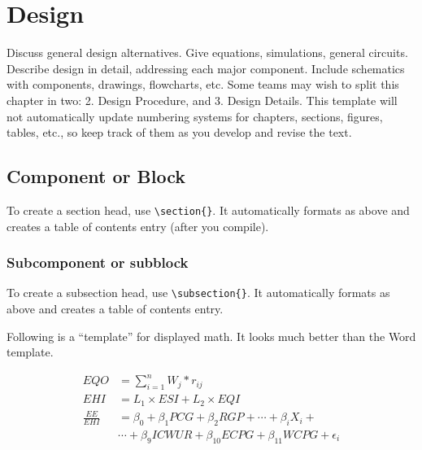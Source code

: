 \chapter{Design}
Discuss general design alternatives. Give equations, simulations, general circuits. Describe design in detail, addressing each major component. Include schematics with components, drawings, flowcharts, etc. Some teams may wish to split this chapter in two: 2. Design Procedure, and 3. Design Details. This template will not automatically update numbering systems for chapters, sections, figures, tables, etc., so keep track of them as you develop and revise the text.

\section{Component or Block}
To create a section head, use \verb|\section{}|. It automatically formats as above and creates a table of contents entry (after you compile).

\subsection{Subcomponent or subblock}
To create a subsection head, use \verb|\subsection{}|. It automatically formats as above and creates a table of contents entry.

Following is a “template” for displayed math. It looks much better than the Word template.

\begin{align}
    EQO &= \sum_{i=1}^n W_j * r_{ij} \\
    EHI &= L_1 \times ESI + L_2 \times EQI \\
    \frac{EE}{EHI} &= \beta_0 + \beta_1 PCG + \beta_2 RGP + \cdots + \beta_i X_i + \\
    & \cdots + \beta_9 ICWUR + \beta_{10} ECPG + \beta_11 WCPG + \epsilon_i
\end{align}

